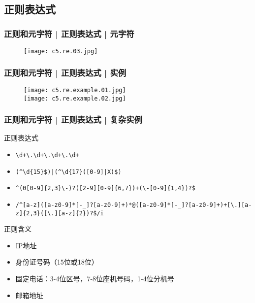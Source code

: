 \subsection{正则表达式}
\begin{frame}
  \frametitle{正则和元字符 | 正则表达式 | 元字符}
  \begin{figure}
    \centering
    \texttt{[image: c5.re.03.jpg]}
  \end{figure}
\end{frame}

\begin{frame}
  \frametitle{正则和元字符 | 正则表达式 | \alert{实例}}
  \begin{figure}
    \centering
    \texttt{[image: c5.re.example.01.jpg]}\\
    \texttt{[image: c5.re.example.02.jpg]}
  \end{figure}
\end{frame}

\begin{frame}[fragile]
  \frametitle{正则和元字符 | 正则表达式 | 复杂实例}
  \begin{block}{正则表达式}
    \begin{itemize}
      \item<2-> \verb|\d+\.\d+\.\d+\.\d+|
      \item<4-> \verb=(^\d{15}$)|(^\d{17}([0-9]|X)$)=
      \item<6-> \verb|^(0[0-9]{2,3}\-)?([2-9][0-9]{6,7})+(\-[0-9]{1,4})?$|
      \item<8-> \verb|/^[a-z]([a-z0-9]*[-_]?[a-z0-9]+)*@([a-z0-9]*[-_]?[a-z0-9]+)+[\.][a-z]{2,3}([\.][a-z]{2})?$/i|
    \end{itemize}
  \end{block}
  \begin{block}{正则含义}
    \begin{itemize}
      \item<3-> IP地址
      \item<5-> 身份证号码（15位或18位）
      \item<7-> 固定电话：3-4位区号，7-8位座机号码，1-4位分机号
      \item<9-> 邮箱地址
    \end{itemize}
  \end{block}
\end{frame}

